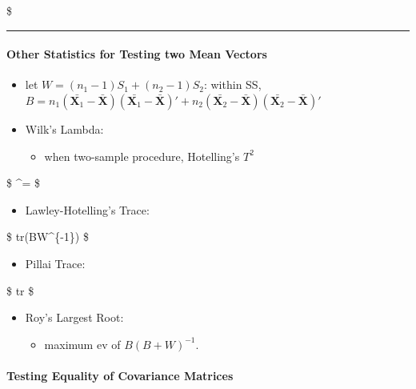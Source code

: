 \documentclass[
]{book}
\providecommand{\tightlist}{%
  \setlength{\itemsep}{0pt}\setlength{\parskip}{0pt}}
\begin{document}
{{{\$

\begin{center}\rule{0.5\linewidth}{0.5pt}\end{center}

\hypertarget{other-statistics-for-testing-two-mean-vectors}{%
\paragraph{Other Statistics for Testing two Mean Vectors}\label{other-statistics-for-testing-two-mean-vectors}}

\begin{itemize}
\item
  let \(W=(n_1-1)S_1 + (n_2-1)S_2\): within SS, \(B=n_1 (\bar {\pmb X_1} - \bar {\pmb X})(\bar {\pmb X_1} - \bar {\pmb X})' + n_2 (\bar {\pmb X_2} - \bar {\pmb X})(\bar {\pmb X_2} - \bar {\pmb X})'\)
\item
  Wilk's Lambda:

  \begin{itemize}
  \tightlist
  \item
    when two-sample procedure, Hotelling's \(T^2\)
  \end{itemize}
\end{itemize}

\$
\Lambda\^{}\ast = 
\$

\begin{itemize}
\tightlist
\item
  Lawley-Hotelling's Trace:
\end{itemize}

\$
tr(BW\^{}\{-1\})
\$

\begin{itemize}
\tightlist
\item
  Pillai Trace:
\end{itemize}

\$
tr \left[ B(B+W)^{-1} \right]\$

\begin{itemize}
\tightlist
\item
  Roy's Largest Root:

  \begin{itemize}
  \tightlist
  \item
    maximum ev of \(B(B+W)^{-1}\).
  \end{itemize}
\end{itemize}

\hypertarget{testing-equality-of-covariance-matrices}{%
\paragraph{Testing Equality of Covariance Matrices}\label{testing-equality-of-covariance-matrices}}

}}}
\end{document}
